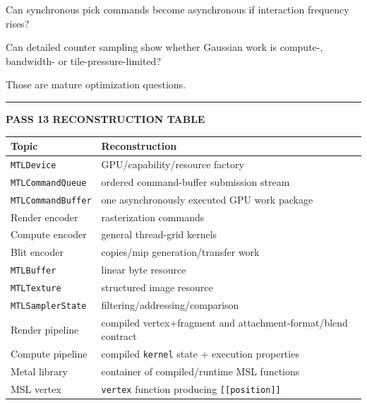 Can synchronous pick commands become asynchronous if interaction frequency rises?

Can detailed counter sampling show whether Gaussian work is compute-, bandwidth- or tile-pressure-limited?

Those are mature optimization questions.

\begin{center}\rule{0.5\linewidth}{0.5pt}\end{center}

\textbf{PASS 13 RECONSTRUCTION TABLE}

{\def\LTcaptype{none} %
\begin{longtable}[]{@{}
  >{\raggedright\arraybackslash}p{}
  >{\raggedright\arraybackslash}p{}@{}}
\toprule\noalign{}
\begin{minipage}[b]{\linewidth}\raggedright
Topic
\end{minipage} & \begin{minipage}[b]{\linewidth}\raggedright
Reconstruction
\end{minipage} \\
\midrule\noalign{}
\endhead
\bottomrule\noalign{}
\endlastfoot
\texttt{MTLDevice} & GPU/capability/resource factory \\
\texttt{MTLCommandQueue} & ordered command-buffer submission stream \\
\texttt{MTLCommandBuffer} & one asynchronously executed GPU work package \\
Render encoder & rasterization commands \\
Compute encoder & general thread-grid kernels \\
Blit encoder & copies/mip generation/transfer work \\
\texttt{MTLBuffer} & linear byte resource \\
\texttt{MTLTexture} & structured image resource \\
\texttt{MTLSamplerState} & filtering/addressing/comparison \\
Render pipeline & compiled vertex+fragment and attachment-format/blend contract \\
Compute pipeline & compiled \texttt{kernel} state + execution properties \\
Metal library & container of compiled/runtime MSL functions \\
MSL vertex & \texttt{vertex} function producing \texttt{{[}{[}position{]}{]}} \\

\end{longtable}}
